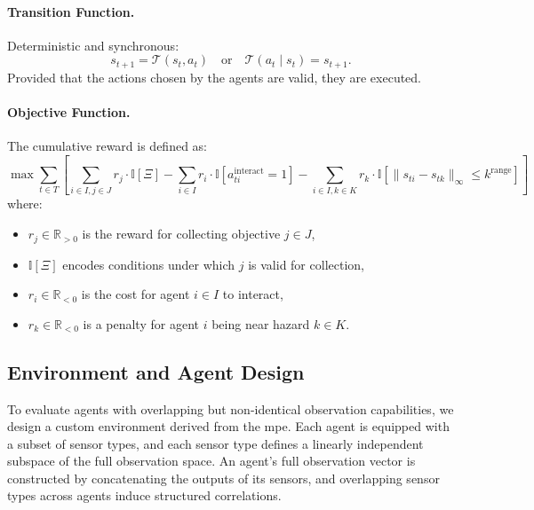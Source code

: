 
\paragraph{Transition Function.} 
Deterministic and synchronous:
\[
    s_{t+1} = \mathcal{T}(s_t, a_t) \quad \text{or} \quad \mathcal{T}(a_t \mid s_t) = s_{t+1}.
\]
Provided that the actions chosen by the agents are valid, they are executed.

\paragraph{Objective Function.} 
The cumulative reward is defined as:
\[
    \max \sum_{t \in T} \left[
        \sum_{i \in I, j \in J} r_j \cdot \mathbb{I}[\Xi]
        - \sum_{i \in I} r_i \cdot \mathbb{I}[a_{ti}^\text{interact} = 1]
        - \sum_{i \in I, k \in K} r_k \cdot \mathbb{I}[\|s_{ti} - s_{tk}\|_\infty \leq k^\text{range}]
    \right]
\]
where:
\begin{itemize}
    \item \(r_j \in \mathbb{R}_{>0}\) is the reward for collecting objective \(j \in J\),
    \item \(\mathbb{I}[\Xi]\) encodes conditions under which \(j\) is valid for collection,
    \item \(r_i \in \mathbb{R}_{<0}\) is the cost for agent \(i \in I\) to interact,
    \item \(r_k \in \mathbb{R}_{<0}\) is a penalty for agent \(i\) being near hazard \(k \in K\).
\end{itemize}






\subsection{Environment and Agent Design}

To evaluate agents with overlapping but non-identical observation capabilities, 
we design a custom environment derived from the \gls{mpe}. 
Each agent is equipped with a subset of sensor types, 
and each sensor type defines a linearly independent subspace of the 
full observation space. An agent's full observation vector is constructed by 
concatenating the outputs of its sensors, and overlapping sensor types across 
agents induce structured correlations.

